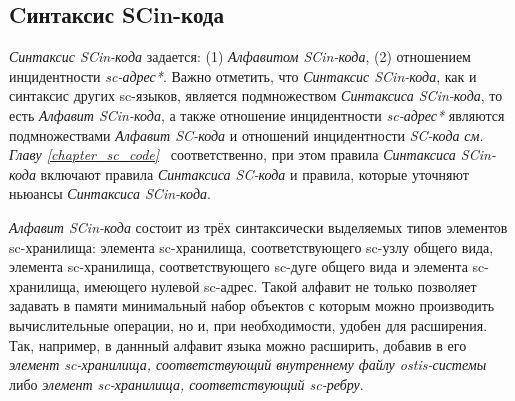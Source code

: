 \subsection{Cинтаксис SCin-кода}
\label{sec_soft_platform_scin_code_alphabet_and_syntax}

\textit{Синтаксис SCin-кода} задается: (1) \textit{Алфавитом SCin-кода}, (2) отношением инцидентности \textit{sc-адрес*}. Важно отметить, что \textit{Синтаксис SCin-кода}, как и синтаксис других sc-языков, является подмножеством \textit{Синтаксиса SCin-кода}, то есть \textit{Алфавит SCin-кода\scnsupergroupsign}, а также отношение инцидентности \textit{sc-адрес*} являются подмножествами \textit{Алфавит SC-кода\scnsupergroupsign} и отношений инцидентности \textit{SC-кода} \textit{см. Главу \ref{chapter_sc_code}~} соответственно, при этом правила \textit{Синтаксиса SCin-кода} включают правила \textit{Синтаксиса SC-кода} и правила, которые уточняют ньюансы \textit{Синтаксиса SCin-кода}.

\begin{SCn}
\begin{scneqtoset}
    \begin{scnindent}
    \end{scnindent}
\end{scneqtoset}
\end{SCn}

\textit{Алфавит SCin-кода\scnsupergroupsign} состоит из трёх синтаксически выделяемых типов элементов sc-хранилища: элемента sc-хранилища, соответствующего sc-узлу общего вида, элемента sc-хранилища, соответствующего sc-дуге общего вида и элемента sc-хранилища, имеющего нулевой sc-адрес. Такой алфавит не только позволяет задавать в памяти минимальный набор объектов с которым можно производить вычислительные операции, но и, при необходимости, удобен для расширения. Так, например, в даннный алфавит языка можно расширить, добавив в его \textit{элемент sc-хранилища, соответствующий внутреннему файлу ostis-системы} либо \textit{элемент sc-хранилища, соответствующий sc-ребру}.

\begin{SCn}
\end{SCn}

